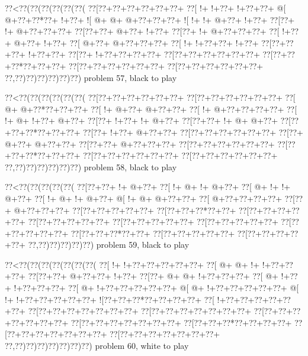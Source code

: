 \vbox{\vbox{\goo
\0??<\0??(\0??(\0??(\0??(\0??(\0??(
\0??[\0??+\0??+\0??+\0??+\0??+\0??+
\0??[\- !+\- !+\0??+\- !+\0??+\0??+
\- @[\- @+\0??+\0??*\0??+\- !+\0??+
\- ![\- @+\- @+\- @+\0??+\0??+\0??+
\- ![\- !+\- !+\- @+\0??+\- !+\0??+
\0??[\0??+\- !+\- @+\0??+\0??+\0??+
\0??[\0??+\0??+\- @+\0??+\- !+\0??+
\0??[\0??+\- !+\- @+\0??+\0??+\0??+
\0??[\- !+\0??+\- @+\0??+\- !+\0??+
\0??[\- @+\0??+\- @+\0??+\0??+\0??+
\0??[\- !+\- !+\0??+\0??+\- !+\0??+
\0??[\0??+\0??+\0??+\- !+\0??+\0??+
\0??[\0??+\- !+\0??+\0??+\0??+\0??+
\0??[\0??+\0??+\0??+\0??+\0??+\0??+
\0??[\0??+\0??+\0??*\0??+\0??+\0??+
\0??[\0??+\0??+\0??+\0??+\0??+\0??+
\0??[\0??+\0??+\0??+\0??+\0??+\0??+
\0??,\0??)\0??)\0??)\0??)\0??)\0??)
}
\hfil problem 57, black to play\hfil\break
}

\vbox{\vbox{\goo
\0??<\0??(\0??(\0??(\0??(\0??(\0??(
\0??[\0??+\0??+\0??+\0??+\0??+\0??+
\0??[\0??+\0??+\0??+\0??+\0??+\0??+
\0??[\- @+\- @+\0??*\0??+\0??+\0??+
\0??[\- !+\- @+\0??+\- @+\0??+\0??+
\0??[\- !+\- @+\0??+\0??+\0??+\0??+
\0??[\- !+\- @+\- !+\0??+\- @+\0??+
\0??[\0??+\- !+\0??+\- !+\- @+\0??+
\0??[\0??+\0??+\- !+\- @+\- @+\0??+
\0??[\0??+\0??+\0??*\0??+\0??+\0??+
\0??[\0??+\- !+\0??+\- @+\0??+\0??+
\0??[\0??+\0??+\0??+\0??+\0??+\0??+
\0??[\0??+\- @+\0??+\- @+\0??+\0??+
\0??[\0??+\0??+\- @+\0??+\0??+\0??+
\0??[\0??+\0??+\0??+\0??+\0??+\0??+
\0??[\0??+\0??+\0??*\0??+\0??+\0??+
\0??[\0??+\0??+\0??+\0??+\0??+\0??+
\0??[\0??+\0??+\0??+\0??+\0??+\0??+
\0??,\0??)\0??)\0??)\0??)\0??)\0??)
}
\hfil problem 58, black to play\hfil\break
}

\vbox{\vbox{\goo
\0??<\0??(\0??(\0??(\0??(\0??(
\0??[\0??+\0??+\- !+\- @+\0??+
\0??[\- !+\- @+\- !+\- @+\0??+
\0??[\- @+\- !+\- !+\- @+\0??+
\0??[\- !+\- @+\- !+\- @+\0??+
\- @[\- !+\- @+\- @+\0??+\0??+
\0??[\- @+\0??+\0??+\0??+\0??+
\0??[\0??+\- @+\0??+\0??+\0??+
\0??[\0??+\0??+\0??+\0??+\0??+
\0??[\0??+\0??+\0??*\0??+\0??+
\0??[\0??+\0??+\0??+\0??+\0??+
\0??[\0??+\0??+\0??+\0??+\0??+
\0??[\0??+\0??+\0??+\0??+\0??+
\0??[\0??+\0??+\0??+\0??+\0??+
\0??[\0??+\0??+\0??+\0??+\0??+
\0??[\0??+\0??+\0??*\0??+\0??+
\0??[\0??+\0??+\0??+\0??+\0??+
\0??[\0??+\0??+\0??+\0??+\0??+
\0??,\0??)\0??)\0??)\0??)\0??)
}
\hfil problem 59, black to play\hfil\break
}

\vbox{\vbox{\goo
\0??<\0??(\0??(\0??(\0??(\0??(\0??(\0??(
\0??[\- !+\- !+\0??+\0??+\0??+\0??+\0??+
\0??[\- @+\- @+\- !+\- !+\0??+\0??+\0??+
\0??[\0??+\0??+\- @+\0??+\0??+\- !+\0??+
\0??[\0??+\- @+\- @+\- !+\0??+\0??+\0??+
\0??[\- @+\- !+\0??+\- !+\0??+\0??+\0??+
\0??[\- @+\- !+\0??+\0??+\0??+\0??+\0??+
\- @[\- @+\- !+\0??+\0??+\0??+\0??+\0??+
\- @[\- !+\- !+\0??+\0??+\0??+\0??+\0??+
\- ![\0??+\0??+\0??*\0??+\0??+\0??+\0??+
\0??[\- !+\0??+\0??+\0??+\0??+\0??+\0??+
\0??[\0??+\0??+\0??+\0??+\0??+\0??+\0??+
\0??[\0??+\0??+\0??+\0??+\0??+\0??+\0??+
\0??[\0??+\0??+\0??+\0??+\0??+\0??+\0??+
\0??[\0??+\0??+\0??+\0??+\0??+\0??+\0??+
\0??[\0??+\0??+\0??*\0??+\0??+\0??+\0??+
\0??[\0??+\0??+\0??+\0??+\0??+\0??+\0??+
\0??[\0??+\0??+\0??+\0??+\0??+\0??+\0??+
\0??,\0??)\0??)\0??)\0??)\0??)\0??)\0??)
}
\hfil problem 60, white to play\hfil\break
}

